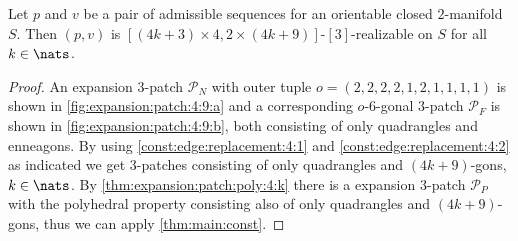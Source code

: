 \begin{theorem}
  Let $p$ and $v$ be a pair of admissible sequences for an orientable closed $2$-manifold $S$. Then $(p, v)$ is $[(4k + 3) \times 4, 2 \times (4k+9)]$-$[3]$-realizable on $S$ for all $k \in \nats$.
  \begin{proof}
    An expansion $3$-patch $\mathcal{P}_N$ with outer tuple $o = (2, 2, 2, 2, 1, 2, 1, 1, 1, 1)$ is shown in \autoref{fig:expansion:patch:4:9:a} and a corresponding $o$-$6$-gonal $3$-patch $\mathcal{P}_F$ is shown in \autoref{fig:expansion:patch:4:9:b}, both consisting of only quadrangles and enneagons. By using \autoref{const:edge:replacement:4:1} and \autoref{const:edge:replacement:4:2} as indicated we get $3$-patches consisting of only quadrangles and $(4k+9)$-gons, $k \in \nats$. By \autoref{thm:expansion:patch:poly:4:k} there is a expansion $3$-patch $\mathcal{P}_P$ with the polyhedral property consisting also of only quadrangles and $(4k+9)$-gons, thus we can apply \autoref{thm:main:const}.
  \end{proof}
\end{theorem}
{\par\vspace*{\fill}}
